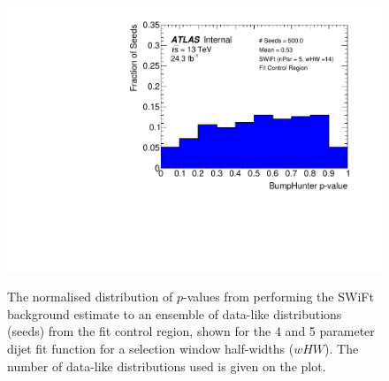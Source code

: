 \begin{figure}[!b]
 {                                                    
  \includegraphics[width=0.48\linewidth, angle=0]{figs/Dibjet/LowMass/FitStudy_min566/pVal_bumpHunter_corrFitCR_5para_low14_high14.pdf}
}                                                                                              
\caption[The normalised distribution of \bh{} \mbox{$p$-value}s from performing the SWiFt background estimate to an ensemble of
          data-like distributions from the \lm{} fit control region.]
        {\label{fig:bumpH_spuriousSignal}
          The normalised distribution of \bh{} \mbox{$p$-value}s from performing the SWiFt background estimate to an ensemble of
          data-like distributions (seeds) from the \lm{} fit control region,
          shown for the 4 and 5 parameter dijet fit function for a selection window half-widths ($wHW$). 
          The number of data-like distributions used is given on the plot.
}
\end{figure}

